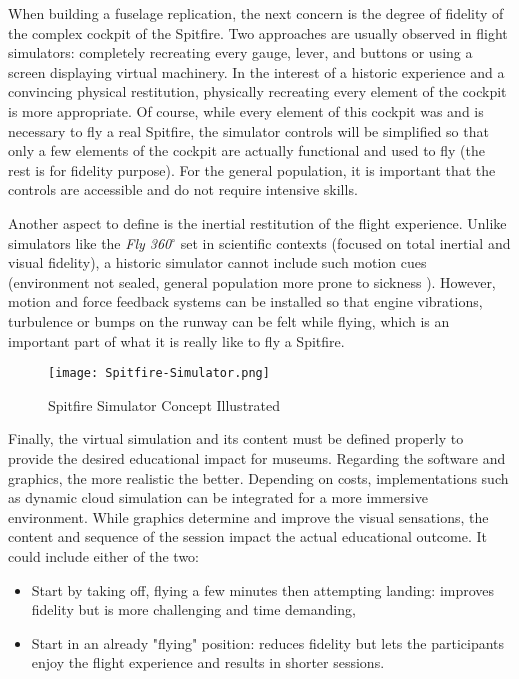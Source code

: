\documentclass[authoryear,preprint]{sigplanconf}
\begin{document}
When building a fuselage replication, the next concern is the degree of fidelity of the complex cockpit of the Spitfire. Two approaches are usually observed in flight simulators: completely recreating every gauge, lever, and buttons or using a screen displaying virtual machinery. In the interest of a historic experience and a convincing physical restitution, physically recreating every element of the cockpit is more appropriate. Of course, while every element of this cockpit was and is necessary to fly a real Spitfire, the simulator controls will be simplified so that only a few elements of the cockpit are actually functional and used to fly (the rest is for fidelity purpose). For the general population, it is important that the controls are accessible and do not require intensive skills.

Another aspect to define is the inertial restitution of the flight experience. Unlike simulators like the \textit{Fly 360}$^{\circ}$ set in scientific contexts (focused on total inertial and visual fidelity), a historic simulator cannot include such motion cues (environment not sealed, general population more prone to sickness \cite{SimuCont}). However, motion and force feedback \cite{FFeed} systems can be installed so that engine vibrations, turbulence or bumps on the runway can be felt while flying, which is an important part of what it is really like to fly a Spitfire.


\begin{figure}[!h]
\centering
\texttt{[image: Spitfire-Simulator.png]}
\caption{Spitfire Simulator Concept Illustrated}
\label{simconcept}
\end{figure}

Finally, the virtual simulation and its content must be defined properly to provide the desired educational impact for museums. Regarding the software and graphics, the more realistic the better. Depending on costs, implementations such as dynamic cloud simulation \cite{Cloud} can be integrated for a more immersive environment. While graphics determine and improve the visual sensations, the content and
sequence of the session impact the actual educational outcome. It could include either of the two:
\begin{itemize}
    \item Start by taking off, flying a few minutes then attempting landing: improves fidelity but is more challenging and time demanding,
    \item Start in an already "flying" position: reduces fidelity but lets the participants enjoy the flight experience and results in shorter sessions.
\end{itemize}
\end{document}
